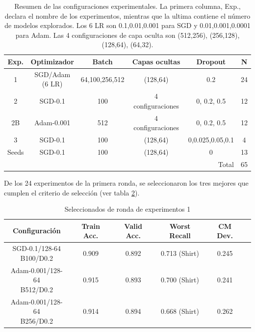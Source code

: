 \documentclass[aps,prl,twocolumn,superscriptaddress]{revtex4-2}
\begin{document}
\begin{table}[H]
\centering
\scriptsize
\setlength{\tabcolsep}{1pt}
\begin{tabular}{c|c|c|c|c|c}
\hline
Exp. & Optimizador & Batch & Capas ocultas & Dropout & N \\
\hline
1 & \makecell{SGD/Adam\\(6 LR)} & 64,100,256,512 & (128,64) & 0.2 & 24 \\
2 & SGD-0.1 & 100 & 4 configuraciones & 0, 0.2, 0.5 & 12 \\
2B & Adam-0.001 & 512 & 4 configuraciones & 0, 0.2, 0.5 & 12 \\
3 & SGD-0.1 & 100 & (128,64) & 0,0.025,0.05,0.1 & 4 \\
Seeds & SGD-0.1 & 100 & (128,64) & 0 & 13 \\
\hline
\multicolumn{5}{r|}{Total } & 65 \\
\hline
\end{tabular}
\caption{Resumen de las configuraciones experimentales. La primera columna, Exp., declara el nombre de los experimentos, mientras que la ultima contiene el número de modelos explorados. Los 6 LR son 0.1,0.01,0.001 para SGD y 0.01,0.001,0.0001 para Adam. Las 4 configuraciones de capa oculta son (512,256), (256,128), (128,64), (64,32).}
\label{tab:gen}
\end{table}

De los 24 experimentos de la primera ronda, se seleccionaron los tres mejores que cumplen el criterio de selección (ver tabla \ref{tab:exp1}).
\begin{table}[H]
\centering
\scriptsize
\setlength{\tabcolsep}{3pt}
\begin{tabular}{c|c|c|c|c|c}
\hline
Configuración & Train Acc. & Valid Acc. & Worst Recall & CM Dev. \\
\hline
\makecell{SGD-0.1/128-64\\B100/D0.2}
& 0.909 & 0.892 & 0.713 (Shirt) & 0.245 \\

\makecell{Adam-0.001/128-64\\B512/D0.2}
& 0.915 & 0.893 & 0.700 (Shirt) & 0.241 \\

\makecell{Adam-0.001/128-64\\B256/D0.2}
& 0.914 & 0.894 & 0.668 (Shirt) & 0.262 \\
\hline
\end{tabular}
\caption{Seleccionados de ronda de experimentos 1}
\label{tab:exp1}
\end{table}
\end{document}
